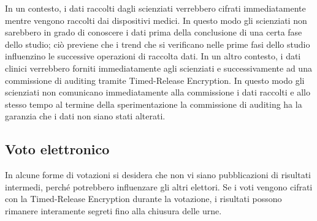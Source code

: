 In un contesto, i dati raccolti dagli scienziati verrebbero cifrati
immediatamente mentre vengono raccolti dai dispositivi medici. In questo modo gli scienziati
non sarebbero in grado di conoscere i dati prima della conclusione di una certa fase dello studio;
ciò previene che i trend che si verificano nelle prime fasi dello studio influenzino
le successive operazioni di raccolta dati.
In un altro contesto, i dati clinici verrebbero forniti immediatamente agli scienziati
e successivamente ad una commissione di auditing tramite Timed-Release Encryption.
In questo modo gli scienziati non comunicano immediatamente alla commissione i dati raccolti
e allo stesso tempo al termine della sperimentazione
la commissione di auditing ha la garanzia che i dati non siano stati alterati.

\subsection{Voto elettronico}
In alcune forme di votazioni si desidera che non vi siano pubblicazioni di risultati intermedi,
perché potrebbero influenzare gli altri elettori. Se i voti vengono cifrati con
la Timed-Release Encryption durante la votazione, i risultati possono rimanere interamente segreti
fino alla chiusura delle urne.




